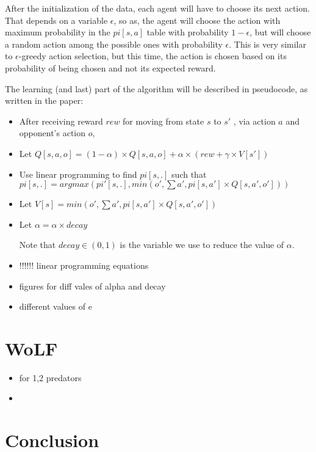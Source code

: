 \documentclass[a4paper,11pt]{article}
\begin{document}
After the initialization of the data, each agent will have to choose its next action. That depends on a variable $\epsilon$, so as, the agent will choose the action with maximum probability in the $pi[s,a]$ table with probability $1-\epsilon$, but will choose a random action among the possible ones with probability $\epsilon$. This is very similar to $\epsilon$-greedy action selection, but this time, the action is chosen based on its probability of being chosen and not its expected reward.

The learning (and last) part of the algorithm will be described in pseudocode, as written in the paper:

\begin{itemize}
\item After receiving reward $rew$ for moving from state $s$ to $s'$ , via action $a$ and opponent's action $o$,

\item Let $Q[s,a,o] = (1-\alpha)\times Q[s,a,o] + \alpha \times (rew+ \gamma \times V[s'])$

\item Use linear programming to find $pi[s,.]$ such that $pi[s,.] = argmax { (pi'[s,.], min (o', \sum{a', pi[s,a'] \times Q[s,a',o']}))}$ 

\item Let $V[s] = min( o', \sum{a', pi[s,a'] \times Q[s,a',o']})$

\item Let $\alpha = \alpha \times decay$

Note that $decay \in (0,1)$ is the variable we use to reduce the value of $\alpha$. 


\item !!!!!! linear programming equations
\item figures for diff vales of alpha and decay
\item different values of e

\end{itemize}


\section*{WoLF}
\begin{itemize}
\item for 1,2  predators
\item 
\end{itemize}



\section{Conclusion}
\end{document}
